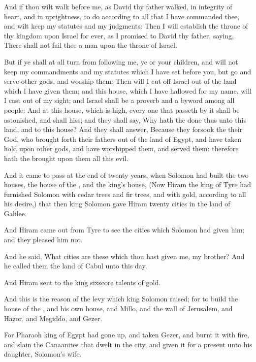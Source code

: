 \verse And if thou wilt walk before me, as David thy father walked, in integrity of heart, and in uprightness, to do according to all that I have commanded thee, and wilt keep my statutes and my judgments: \verse Then I will establish the throne of thy kingdom upon Israel for ever, as I promised to David thy father, saying, There shall not fail thee a man upon the throne of Israel.

\verse But if ye shall at all turn from following me, ye or your children, and will not keep my commandments and my statutes which I have set before you, but go and serve other gods, and worship them: \verse Then will I cut off Israel out of the land which I have given them; and this house, which I have hallowed for my name, will I cast out of my sight; and Israel shall be a proverb and a byword among all people: \verse And at this house, which is high, every one that passeth by it shall be astonished, and shall hiss; and they shall say, Why hath the \LORD done thus unto this land, and to this house?  \verse And they shall answer, Because they forsook the \LORD their God, who brought forth their fathers out of the land of Egypt, and have taken hold upon other gods, and have worshipped them, and served them: therefore hath the \LORD brought upon them all this evil.

\verse And it came to pass at the end of twenty years, when Solomon had built the two houses, the house of the \LORD, and the king's house, \verse (Now Hiram the king of Tyre had furnished Solomon with cedar trees and fir trees, and with gold, according to all his desire,) that then king Solomon gave Hiram twenty cities in the land of Galilee.

\verse And Hiram came out from Tyre to see the cities which Solomon had given him; and they pleased him not.

\verse And he said, What cities are these which thou hast given me, my brother? And he called them the land of Cabul unto this day.

\verse And Hiram sent to the king sixscore talents of gold.

\verse And this is the reason of the levy which king Solomon raised; for to build the house of the \LORD, and his own house, and Millo, and the wall of Jerusalem, and Hazor, and Megiddo, and Gezer.

\verse For Pharaoh king of Egypt had gone up, and taken Gezer, and burnt it with fire, and slain the Canaanites that dwelt in the city, and given it for a present unto his daughter, Solomon's wife.

